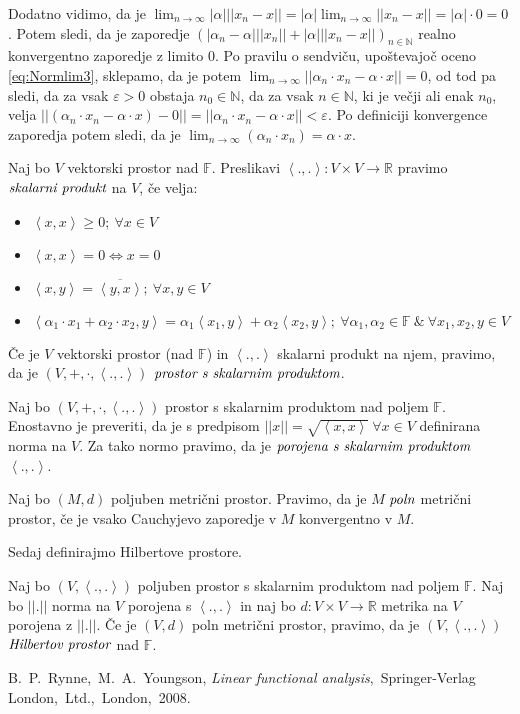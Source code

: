 \documentclass[mat2]{matdelo}
\newcommand{\R}{\mathbb{R}}
\newcommand{\F}{\mathbb{F}}
\newcommand{\N}{\mathbb{N}}
\newcommand{\abs}[1]{\ensuremath{\lvert #1 \rvert}}
\newcommand{\norm}[1]{\abs{\abs{#1}}}
\newcommand{\pojem}[1]{\ensuremath{\emph{#1}}}
\newcommand{\Sp}[2]{\ensuremath{\left<#1, #2\right>}}
\newcommand{\map}[3]{\ensuremath{{#1}:{#2}\rightarrow{#3}}}
\begin{document}
\begin{dokaz}
\begin{enumerate}[i)]
				Dodatno vidimo, da je $\lim_{n\to\infty}\abs{\alpha}\norm{x_n - x} = \abs{\alpha}\lim_{n\to\infty}\norm{x_n - x} = \abs{\alpha}\cdot 0 = 0$. Potem sledi, da je zaporedje $\left(\abs{\alpha_n - \alpha}\norm{x_n} + \abs{\alpha}\norm{x_n - x}\right)_{n\in\N}$ realno konvergentno zaporedje z limito $0$. Po pravilu o sendviču, upoštevajoč oceno \eqref{eq:Normlim3}, sklepamo, da je potem $\lim_{n\to\infty}\norm{\alpha_n\cdot x_n - \alpha\cdot x} = 0$, od tod pa sledi, da za vsak $\varepsilon > 0$ obstaja $n_0\in\N$, da za vsak $n\in\N$, ki je večji ali enak $n_0$, velja $\norm{(\alpha_n\cdot x_n - \alpha\cdot x) - 0}=\norm{\alpha_n\cdot x_n - \alpha\cdot x} < \varepsilon$. Po definiciji konvergence zaporedja potem sledi, da je $\lim_{n\to\infty}(\alpha_n\cdot x_n) = \alpha\cdot x$.
			\end{enumerate}
		\end{dokaz}
		
		\begin{definicija}
			\label{def:ScalProd}
			Naj bo $V$ vektorski prostor nad $\F$. Preslikavi $\map{\Sp{.}{.}}{V\times V}{\R}$ pravimo \pojem{skalarni produkt} na $V$, če velja: \begin{itemize}
				\item $\Sp{x}{x} \geq 0;~\forall x\in V$
				\item $\Sp{x}{x} = 0 \iff x = 0$
				\item $\Sp{x}{y} = \overline{\Sp{y}{x}};~\forall x, y\in V$
				\item $\Sp{\alpha_1\cdot x_1 + \alpha_2\cdot x_2}{y} = \alpha_1\Sp{x_1}{y} +\alpha_2\Sp{x_2}{y};~\forall \alpha_1, \alpha_2\in\F~\&~\forall x_1, x_2, y\in V$
			\end{itemize}
			Če je $V$ vektorski prostor (nad $\F$) in $\Sp{.}{.}$ skalarni produkt na njem, pravimo, da je $(V, +, \cdot, \Sp{.}{.})$ \pojem{prostor s skalarnim produktom}.
		\end{definicija}
		
		\begin{opomba}
			\label{op:ScalProd}
			Naj bo $(V, +, \cdot, \Sp{.}{.})$ prostor s skalarnim produktom nad poljem $\F$. Enostavno je preveriti, da je s predpisom $\norm{x} = \sqrt{\Sp{x}{x}}~\forall x\in V$ definirana norma na $V$. Za tako normo pravimo, da je \pojem{porojena s skalarnim produktom} $\Sp{.}{.}$.
		\end{opomba}
		\begin{definicija}
			\label{def:PolnMP}
			Naj bo $(M, d)$ poljuben metrični prostor. Pravimo, da je $M$ \pojem{poln} metrični prostor, če je vsako Cauchyjevo zaporedje v $M$ konvergentno v $M$.
		\end{definicija}
		Sedaj definirajmo Hilbertove prostore.
		\begin{definicija}
			\label{def:Hilbert}
			Naj bo $(V, \Sp{.}{.})$ poljuben prostor s skalarnim produktom nad poljem $\F$. Naj bo $\norm{.}$ norma na $V$ porojena s $\Sp{.}{.}$ in naj bo $\map{d}{V\times V}{\R}$ metrika na $V$ porojena z $\norm{.}$. Če je $(V, d)$ poln metrični prostor, pravimo, da je $(V, \Sp{.}{.})$ \pojem{Hilbertov prostor} nad $\F$. 
		\end{definicija}
		
		
		
	\begin{thebibliography}{99}
		 B.~P.~Rynne,~M.~A.~Youngson, \emph{Linear functional analysis},~Springer-Verlag London,~Ltd.,~London,~2008.
	\end{thebibliography}
\end{document}

